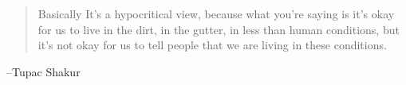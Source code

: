 \documentclass[letterpaper, landscape]{exam}
\begin{document}
  \else
    \vspace{10 cm}
    \begin{quote}
      \begin{em}
        Basically It's a hypocritical view, because what you're saying is it's
        okay for us to live in the dirt, in the gutter, in less than human
        conditions, but it's not okay for us to tell people that we are living
        in these conditions.
      \end{em}
    \end{quote}
    \hspace{2 cm} --Tupac Shakur
  \fi
\end{document}
